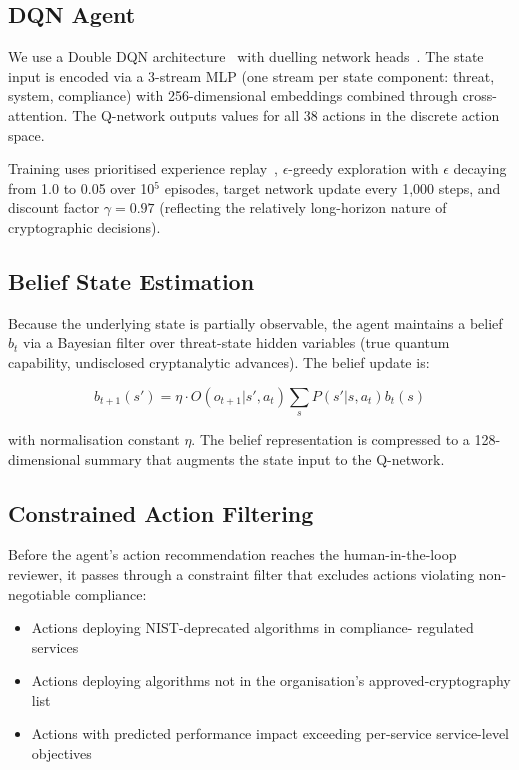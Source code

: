 \documentclass[sigconf,nonacm]{acmart}
\begin{document}
\subsection{DQN Agent}

We use a Double DQN architecture~\cite{vanhasselt2016ddqn} with
duelling network heads~\cite{wang2016dueling}. The state input is
encoded via a 3-stream MLP (one stream per state component:
threat, system, compliance) with 256-dimensional embeddings combined
through cross-attention. The Q-network outputs values for all 38
actions in the discrete action space.

Training uses prioritised experience replay~\cite{schaul2016per},
$\epsilon$-greedy exploration with $\epsilon$ decaying from 1.0 to
0.05 over 10$^5$ episodes, target network update every 1{,}000
steps, and discount factor $\gamma = 0.97$ (reflecting the
relatively long-horizon nature of cryptographic decisions).

\subsection{Belief State Estimation}

Because the underlying state is partially observable, the agent
maintains a belief $b_t$ via a Bayesian filter over threat-state
hidden variables (true quantum capability, undisclosed
cryptanalytic advances). The belief update is:

\begin{equation}
  b_{t+1}(s') = \eta \cdot O(o_{t+1}|s', a_t) \sum_s P(s'|s, a_t) b_t(s)
\end{equation}

with normalisation constant $\eta$. The belief representation is
compressed to a 128-dimensional summary that augments the state
input to the Q-network.

\subsection{Constrained Action Filtering}

Before the agent's action recommendation reaches the
human-in-the-loop reviewer, it passes through a constraint filter
that excludes actions violating non-negotiable compliance:

\begin{itemize}
  \item Actions deploying NIST-deprecated algorithms in compliance-
        regulated services
  \item Actions deploying algorithms not in the organisation's
        approved-cryptography list
  \item Actions with predicted performance impact exceeding
        per-service service-level objectives
\end{itemize}
\end{document}
